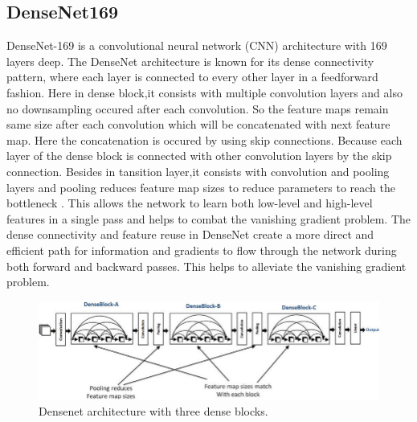 \documentclass[a4paper,12pt,oneside]{book}
\begin{document}
\subsection{DenseNet169}
DenseNet-169 \cite{huang2018densely} is a convolutional neural network (CNN) architecture with 169 layers deep. The DenseNet architecture is known for its dense connectivity pattern, where each layer is connected to every other layer in a feedforward fashion. Here in dense block,it consists with multiple convolution layers and also no downsampling occured after each convolution. So the feature maps remain same size after each convolution which will be concatenated with next feature map. Here the concatenation is occured by using skip connections. Because each layer of the dense block is connected with other convolution layers by the skip connection. 
Besides in tansition layer,it consists with convolution and pooling layers and pooling reduces feature map sizes to reduce parameters to reach the bottleneck . This allows the network to learn both low-level and high-level features in a single pass and helps to combat the vanishing gradient problem. The dense connectivity and feature reuse in DenseNet create a more direct and efficient path for information and gradients to flow through the network during both forward and backward passes. This helps to alleviate the vanishing gradient problem.
\begin{figure}[!hbtp]
\centering
\includegraphics[width=1\textwidth]{Figures/The-architecture-of-DenseNet-121.png}
\captionsetup{font=small}
\vspace{5pt}
\caption{Densenet architecture with three dense blocks.}
\label{fig:resnet}
\end{figure}
\end{document}

